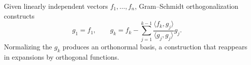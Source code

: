 Given linearly independent vectors $f_1,\ldots,f_n$, Gram--Schmidt orthogonalization constructs
\begin{equation}
g_1=f_1,
\qquad
g_k=f_k-\sum_{j=1}^{k-1}\frac{\langle f_k,g_j\rangle}{\langle g_j,g_j\rangle}g_j.
\end{equation}
Normalizing the $g_k$ produces an orthonormal basis, a construction that reappears in expansions by orthogonal functions.
